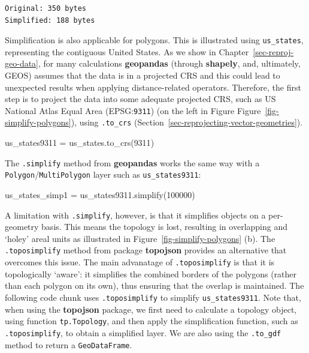 \documentclass[
  letterpaper,
]{krantz}
\newenvironment{Shaded}{\begin{snugshade}}{\end{snugshade}}
\newcommand{\DecValTok}[1]{\textcolor[rgb]{0.68,0.00,0.00}{#1}}
\newcommand{\NormalTok}[1]{\textcolor[rgb]{0.00,0.23,0.31}{#1}}
\newcommand{\OperatorTok}[1]{\textcolor[rgb]{0.37,0.37,0.37}{#1}}
\begin{document}
\begin{verbatim}
Original: 350 bytes
Simplified: 188 bytes
\end{verbatim}

Simplification is also applicable for polygons. This is illustrated
using \texttt{us\_states}, representing the contiguous United States. As
we show in Chapter~\ref{sec-reproj-geo-data}, for many calculations
\textbf{geopandas} (through \textbf{shapely}, and, ultimately, GEOS)
assumes that the data is in a projected CRS and this could lead to
unexpected results when applying distance-related operators. Therefore,
the first step is to project the data into some adequate projected CRS,
such as US National Atlas Equal Area (EPSG:\texttt{9311}) (on the left
in Figure Figure~\ref{fig-simplify-polygons}), using \texttt{.to\_crs}
(Section~\ref{sec-reprojecting-vector-geometries}).

\begin{Shaded}
\begin{Highlighting}[]
\NormalTok{us\_states9311 }\OperatorTok{=}\NormalTok{ us\_states.to\_crs(}\DecValTok{9311}\NormalTok{)}
\end{Highlighting}
\end{Shaded}

The \texttt{.simplify} method from \textbf{geopandas} works the same way
with a
\texttt{\textquotesingle{}Polygon\textquotesingle{}}/\texttt{\textquotesingle{}MultiPolygon\textquotesingle{}}
layer such as \texttt{us\_states9311}:

\begin{Shaded}
\begin{Highlighting}[]
\NormalTok{us\_states\_simp1 }\OperatorTok{=}\NormalTok{ us\_states9311.simplify(}\DecValTok{100000}\NormalTok{)}
\end{Highlighting}
\end{Shaded}

A limitation with \texttt{.simplify}, however, is that it simplifies
objects on a per-geometry basis. This means the topology is lost,
resulting in overlapping and `holey' areal units as illustrated in
Figure~\ref{fig-simplify-polygons} (b). The \texttt{.toposimplify}
method from package \textbf{topojson} provides an alternative that
overcomes this issue. The main advanatage of \texttt{.toposimplify} is
that it is topologically `aware': it simplifies the combined borders of
the polygons (rather than each polygon on its own), thus ensuring that
the overlap is maintained. The following code chunk uses
\texttt{.toposimplify} to simplify \texttt{us\_states9311}. Note that,
when using the \textbf{topojson} package, we first need to calculate a
topology object, using function \texttt{tp.Topology}, and then apply the
simplification function, such as \texttt{.toposimplify}, to obtain a
simplified layer. We are also using the \texttt{.to\_gdf} method to
return a \texttt{GeoDataFrame}.
\end{document}
